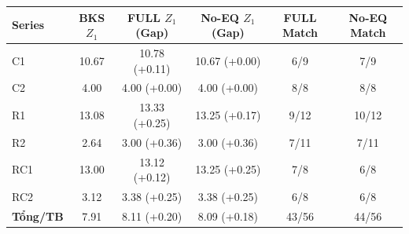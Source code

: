 \begin{tabular}{lccccc}
\toprule
\textbf{Series} & \textbf{BKS $Z_1$} & \textbf{FULL $Z_1$ (Gap)} & \textbf{No-EQ $Z_1$ (Gap)} & \textbf{FULL Match} & \textbf{No-EQ Match} \\
\midrule
C1 & 10.67 & 10.78 (+0.11) & 10.67 (+0.00) & 6/9 & 7/9 \\
C2 & 4.00 & 4.00 (+0.00) & 4.00 (+0.00) & 8/8 & 8/8 \\
R1 & 13.08 & 13.33 (+0.25) & 13.25 (+0.17) & 9/12 & 10/12 \\
R2 & 2.64 & 3.00 (+0.36) & 3.00 (+0.36) & 7/11 & 7/11 \\
RC1 & 13.00 & 13.12 (+0.12) & 13.25 (+0.25) & 7/8 & 6/8 \\
RC2 & 3.12 & 3.38 (+0.25) & 3.38 (+0.25) & 6/8 & 6/8 \\
\midrule
\textbf{Tổng/TB} & 7.91 & 8.11 (+0.20) & 8.09 (+0.18) & 43/56 & 44/56 \\
\bottomrule
\end{tabular}

